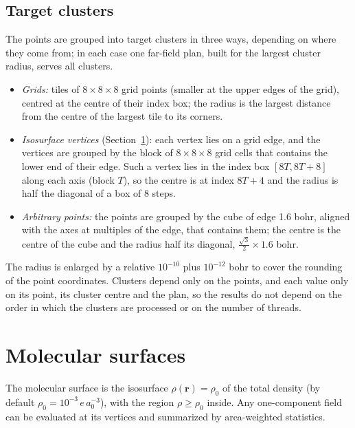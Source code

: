 \documentclass[11pt,a4paper]{article}
\begin{document}
\subsection{Target clusters}\label{sec:esp-clusters}
The points are grouped into target clusters in three ways, depending on
where they come from; in each case one far-field plan, built for the
largest cluster radius, serves all clusters.
\begin{itemize}
\item \emph{Grids:} tiles of $8\times8\times8$ grid points (smaller at the
 upper edges of the grid), centred at the centre of their index box; the
 radius is the largest distance from the centre of the largest tile to its
 corners.
\item \emph{Isosurface vertices} (Section~\ref{sec:surfaces}): each vertex
 lies on a grid edge, and the vertices are grouped by the block of
 $8\times8\times8$ grid cells that contains the lower end of their edge.
 Such a vertex lies in the index box $[8T,8T+8]$ along each axis (block
 $T$), so the centre is at index $8T+4$ and the radius is half the diagonal
 of a box of 8 steps.
\item \emph{Arbitrary points:} the points are grouped by the cube of edge
 1.6 bohr, aligned with the axes at multiples of the edge, that contains
 them; the centre is the centre of the cube and the radius half its
 diagonal, $\frac{\sqrt3}{2}\times1.6$ bohr.
\end{itemize}
The radius is enlarged by a relative $10^{-10}$ plus $10^{-12}$ bohr to
cover the rounding of the point coordinates. Clusters depend only on the
points, and each value only on its point, its cluster centre and the plan,
so the results do not depend on the order in which the clusters are
processed or on the number of threads.

\section{Molecular surfaces}\label{sec:surfaces}

The molecular surface is the isosurface $\rho(\mathbf r)=\rho_0$ of the
total density (by default $\rho_0=10^{-3}\,e\,a_0^{-3}$), with the region
$\rho\ge\rho_0$ inside. Any one-component field can be evaluated at its
vertices and summarized by area-weighted statistics.
\end{document}

